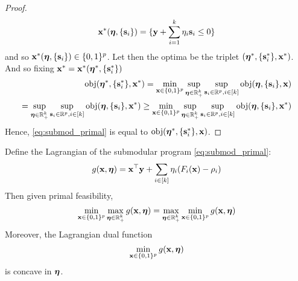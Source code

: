 \begin{proof}
\[
\mathbf{x}^*(\bm{\eta}, \{\mathbf{s}_i\}) = \{\mathbf{y} + \sum_{i=1}^k \eta_i \mathbf{s}_i \le 0\}
\]
and so $\mathbf{x}^*(\bm{\eta}, \{\mathbf{s}_i\}) \in \{0,1\}^p$.
Let then the optima be the triplet $(\bm{\eta}^*, \{\mathbf{s}_i^*\}, \mathbf{x}^*)$.
And so fixing $\mathbf{x}^* = \mathbf{x}^*(\bm{\eta}^*, \{\mathbf{s}^*_i\})$
\[
\begin{aligned}
\textrm{obj}(\bm{\eta}^*, \{\mathbf{s}^*_i\}, \mathbf{x}^*) = \min_{\mathbf{x} \in \{0,1\}^p} \sup_{\bm{\eta} \in \mathbb{R}_+^k} \sup_{\mathbf{s}_i \in \mathbb{R}^p, i \in [k]} \textrm{obj}(\bm{\eta}, \{\mathbf{s}_i\}, \mathbf{x}) \\
= \sup_{\bm{\eta} \in \mathbb{R}_+^k} \sup_{\mathbf{s}_i \in \mathbb{R}^p, i \in [k]} \textrm{obj}(\bm{\eta}, \{\mathbf{s}_i\}, \mathbf{x}^*) \ge \min_{\mathbf{x} \in \{0,1\}^p} \sup_{\bm{\eta} \in \mathbb{R}_+^k} \sup_{\mathbf{s}_i \in \mathbb{R}^p, i \in [k]} \textrm{obj}(\bm{\eta}, \{\mathbf{s}_i\}, \mathbf{x}^*)
\end{aligned}
\]
Hence, \eqref{eq:submod_primal} is equal to $\textrm{obj}(\bm{\eta}^*, \{\mathbf{s}^*_i\}, \mathbf{x})$.
\end{proof}


\begin{theorem}
\label{thm:submod_duality}
Define the Lagrangian of the submodular program \eqref{eq:submod_primal}:
\[
g(\mathbf{x},\bm{\eta}) = \mathbf{x}^\top \mathbf{y} + \sum_{i \in [k]} \eta_i (F_i(\mathbf{x}) - \rho_i)
\]
Then given primal feasibility,
\[
\min_{\mathbf{x} \in \{0, 1\}^p} \max_{\bm{\eta} \in \mathbb{R}_+^k} g(\mathbf{x},\bm{\eta}) = \max_{\bm{\eta} \in \mathbb{R}_+^k} \min_{\mathbf{x} \in \{0, 1\}^p} g(\mathbf{x},\bm{\eta})
\]
Moreover, the Lagrangian dual function
\[
\min_{\mathbf{x} \in \{0, 1\}^p} g(\mathbf{x},\bm{\eta})
\]
is concave in $\bm{\eta}$.
\end{theorem}

